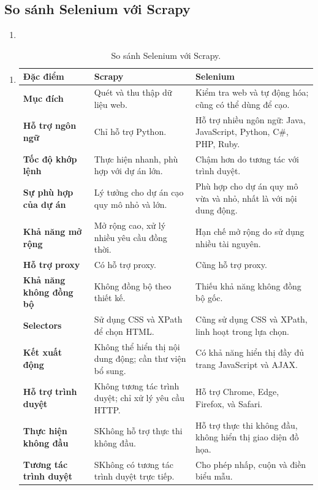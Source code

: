 \subsection{So sánh Selenium với Scrapy}
\begin{enumerate}
    \item []
\end{enumerate}
\begin{enumerate}
    \item []
    \begin{table}[h!]
    \centering
    \begin{tabular}{|>{\centering\arraybackslash}p{3.8cm}|>{\centering\arraybackslash}p{5.5cm}|>{\centering\arraybackslash}p{5.5cm}|}
    \hline
    \textbf{Đặc điểm} & \textbf{Scrapy} & \textbf{Selenium} \\ \hline
    \textbf{Mục đích} & Quét và thu thập dữ liệu web. & Kiểm tra web và tự động hóa; cũng có thể dùng để cạo. \\ \hline
    \textbf{Hỗ trợ ngôn ngữ} & Chỉ hỗ trợ Python.& Hỗ trợ nhiều ngôn ngữ: Java, JavaScript, Python, C\#, PHP, Ruby.\\ \hline
    \textbf{Tốc độ khớp lệnh} & Thực hiện nhanh, phù hợp với dự án lớn.& Chậm hơn do tương tác với trình duyệt.\\ \hline
    \textbf{Sự phù hợp của dự án} & Lý tưởng cho dự án cạo quy mô nhỏ và lớn.& Phù hợp cho dự án quy mô vừa và nhỏ, nhất là với nội dung động.\\ \hline
    \textbf{Khả năng mở rộng} & Mở rộng cao, xử lý nhiều yêu cầu đồng thời.& Hạn chế mở rộng do sử dụng nhiều tài nguyên.\\ \hline
    \textbf{Hỗ trợ proxy} & Có hỗ trợ proxy.& Cũng hỗ trợ proxy.\\ \hline
    \textbf{Khả năng không đồng bộ} & Không đồng bộ theo thiết kế.& Thiếu khả năng không đồng bộ gốc.\\ \hline
    \textbf{Selectors} &Sử dụng CSS và XPath để chọn HTML.& Cũng sử dụng CSS và XPath, linh hoạt trong lựa chọn.\\ \hline
    \textbf{Kết xuất động} &Không thể hiển thị nội dung động; cần thư viện bổ sung.& Có khả năng hiển thị đầy đủ trang JavaScript và AJAX.\\ \hline
    \textbf{Hỗ trợ trình duyệt} &Không tương tác trình duyệt; chỉ xử lý yêu cầu HTTP.& Hỗ trợ Chrome, Edge, Firefox, và Safari.\\ \hline
    \textbf{Thực hiện không đầu} &SKhông hỗ trợ thực thi không đầu.& Hỗ trợ thực thi không đầu, không hiển thị giao diện đồ họa.\\ \hline
    \textbf{Tương tác trình duyệt} &SKhông có tương tác trình duyệt trực tiếp.& Cho phép nhấp, cuộn và điền biểu mẫu.\\ \hline   
    
    \end{tabular}
    \caption{So sánh Selenium với Scrapy.\cite{webscrapingapi_scrapy_2023}}
    \label{tab:selenium_vs_scrapy}
    \end{table}
\end{enumerate}
    
    
    